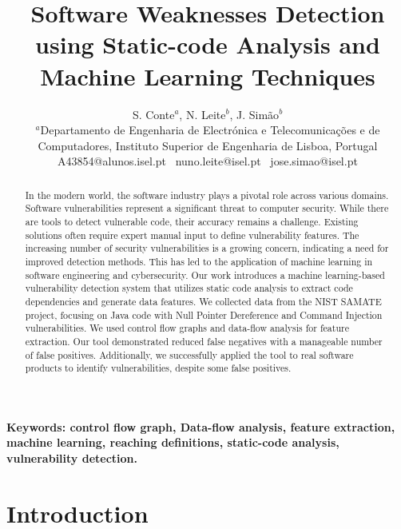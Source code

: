 \documentclass[journal,a4paper]{IEEEtran}
\title{ Software Weaknesses Detection using Static-code Analysis and Machine Learning Techniques}
\begin{document}
\pagestyle{empty}
\author{S. Conte$^a$, N. Leite$^b$, J. Simão$^b$\\
{$^a$Departamento de Engenharia de Electrónica e Telecomunicações e de Computadores, Instituto Superior de Engenharia de Lisboa, Portugal}\\
\hspace{0.3cm} A43854@alunos.isel.pt \ nuno.leite@isel.pt \  jose.simao@isel.pt}

\maketitle

\begin{abstract}
In the modern world, the software industry plays a pivotal role across various domains. Software vulnerabilities represent a significant threat to computer security. While there are tools to detect vulnerable code, their accuracy remains a challenge. Existing solutions often require expert manual input to define vulnerability features. The increasing number of security vulnerabilities is a growing concern, indicating a need for improved detection methods. This has led to the application of machine learning in software engineering and cybersecurity. Our work introduces a machine learning-based vulnerability detection system that utilizes static code analysis to extract code dependencies and generate data features. We collected data from the NIST SAMATE project, focusing on Java code with Null Pointer Dereference and Command Injection vulnerabilities. We used control flow graphs and data-flow analysis for feature extraction. Our tool demonstrated reduced false negatives with a manageable number of false positives. Additionally, we successfully applied the tool to real software products to identify vulnerabilities, despite some false positives.
\end{abstract}

\vspace{.5cm}
\textbf{Keywords: control flow graph, Data-flow analysis, feature extraction, machine learning, reaching definitions, static-code analysis, vulnerability detection.}

\section{Introduction}
\end{document}
